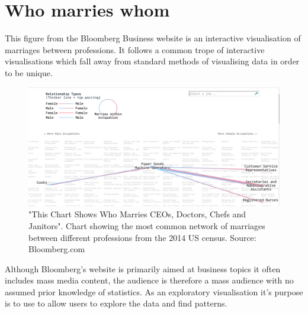 \documentclass[a4paper,10pt, twocolumn]{article}
\begin{document}
\section{Who marries whom\cite{bloomberg}}
 
This figure from the Bloomberg Business website is an interactive visualisation of marriages between professions. It follows a common trope of interactive visualisations which fall away from standard methods of visualising data in order to be unique. 

\begin{figure}[b]
	\includegraphics[width=\linewidth]{Bloomberg1.png}
	\centering
	\caption{"This Chart Shows Who Marries CEOs, Doctors, Chefs and Janitors". Chart showing the most common network of marriages between different professions from the 2014 US census. Source: Bloomberg.com \cite{bloomberg}}
	\label{fig:bloomberg}
\end{figure}

Although Bloomberg's website is primarily aimed at business topics it often includes mass media content, the audience is therefore a mass audience with no assumed prior knowledge of statistics. As an exploratory visualisation it's purpose is to use to allow users to explore the data and find patterns. 
\end{document}
